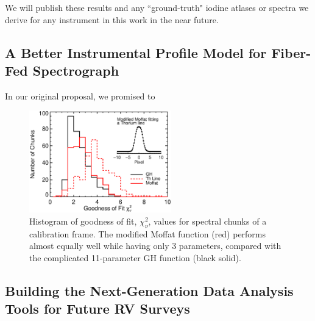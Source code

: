 \documentclass[12pt]{article}
\begin{document}
We will publish these results and any ``ground-truth" iodine atlases
or spectra we derive for any instrument in this work in the near
future.


\vspace{-10pt}
\subsection{A Better Instrumental Profile Model for Fiber-Fed Spectrograph}\label{sec:ip}
\vspace{-5pt}

In our original proposal, we promised to 

\begin{figure}
  \vspace{-35pt}
  \begin{center}
    \includegraphics[width=0.55\textwidth]{thar_vs_moffat}
  \end{center}
  \vspace{-25pt}  
  \caption{Histogram of goodness of fit, $\chi_\nu^2$, values for
    spectral chunks of a calibration frame. The modified Moffat
    function (red) performs almost equally well while having only 3
    parameters, compared with the complicated 11-parameter GH function
    (black solid).} 
  \vspace{-8pt}  
  \label{fig:ip}
\end{figure}


\vspace{-10pt}
\subsection{Building the Next-Generation Data Analysis Tools for Future RV Surveys}\label{sec:newrv}
\vspace{-5pt}
\end{document}
